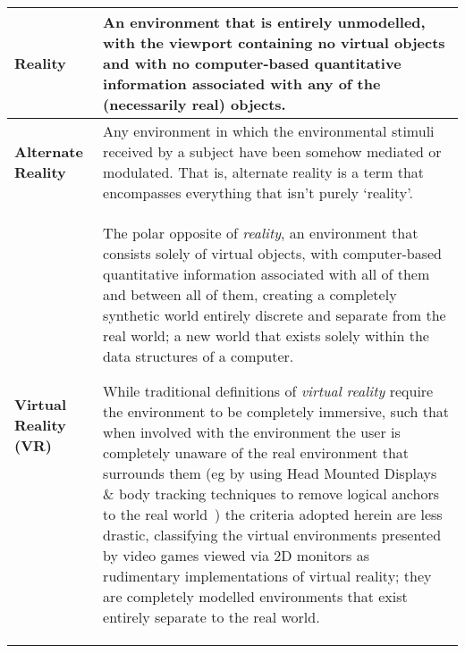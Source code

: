 

\begin{center}
\begin{longtable}{| l | p{12cm} |}

\hline	
	
		
\textbf{Reality} & An environment that is entirely unmodelled, with the viewport containing no virtual objects and with no computer-based quantitative information associated with any of the (necessarily real) objects. \\
		
\hline
		

\textbf{Alternate Reality} & Any environment in which the environmental stimuli received by a subject have been somehow mediated or modulated. That is, alternate reality is a term that encompasses everything that isn't purely `reality'. \\

\hline
		
		
\textbf{Virtual Reality (VR)} & The polar opposite of \textit{reality}, an environment that consists solely of virtual objects, with computer-based quantitative information associated with all of them and between all of them, creating a completely synthetic world entirely discrete and separate from the real world; a new world that exists solely within the data structures of a computer.~\cite{Milgram1994, Milgram1999, Want2009}

While traditional definitions of \textit{virtual reality} require the environment to be completely immersive, such that when involved with the environment the user is completely unaware of the real environment that surrounds them (eg by using Head Mounted Displays \& body tracking techniques to remove logical anchors to the real world~\cite{Druck2006}) the criteria adopted herein are less drastic, classifying the virtual environments presented by video games viewed via 2D monitors as rudimentary implementations of virtual reality; they are completely modelled environments that exist entirely separate to the real world. \\
		

\end{longtable}
\end{center}
